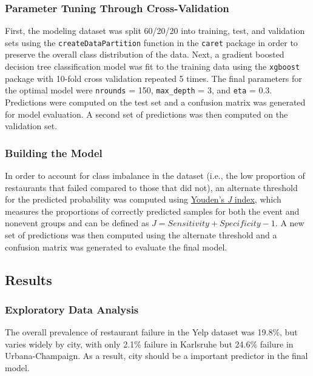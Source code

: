 \documentclass[]{article}
\begin{document}
\subsubsection{Parameter Tuning Through
Cross-Validation}\label{parameter-tuning-through-cross-validation}

First, the modeling dataset was split 60/20/20 into training, test, and
validation sets using the \texttt{createDataPartition} function in the
\texttt{caret} package in order to preserve the overall class
distribution of the data. Next, a gradient boosted decision tree
classification model was fit to the training data using the
\texttt{xgboost} package with 10-fold cross validation repeated 5 times.
The final parameters for the optimal model were \texttt{nrounds} = 150,
\texttt{max\_depth} = 3, and \texttt{eta} = 0.3. Predictions were
computed on the test set and a confusion matrix was generated for model
evaluation. A second set of predictions was then computed on the
validation set.

\subsubsection{Building the Model}\label{building-the-model}

In order to account for class imbalance in the dataset (i.e., the low
proportion of restaurants that failed compared to those that did not),
an alternate threshold for the predicted probability was computed using
\href{http://www.researchgate.net/publication/8308935_Youden_WJIndex_for_rating_diagnostic_tests._Cancer_3\%281\%29_32-35}{Youden's
\emph{J} index}, which measures the proportions of correctly predicted
samples for both the event and nonevent groups and can be defined as
\(J = Sensitivity + Specificity - 1\). A new set of predictions was then
computed using the alternate threshold and a confusion matrix was
generated to evaluate the final model.

\subsection{Results}\label{results}

\subsubsection{Exploratory Data
Analysis}\label{exploratory-data-analysis}

The overall prevalence of restaurant failure in the Yelp dataset was
19.8\%, but varies widely by city, with only 2.1\% failure in Karlsruhe
but 24.6\% failure in Urbana-Champaign. As a result, city should be a
important predictor in the final model.
\end{document}
